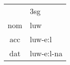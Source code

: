 
\begin{tabular}{cl}
\toprule
          & 3\ac{sg} \\
          \cmidrule{2-2}
\ac{nom}
          & luw                                     \\
\ac{acc}  & luw-e:l                          \\
\ac{dat}  & luw-e:l-na       \\
\bottomrule
\end{tabular}
